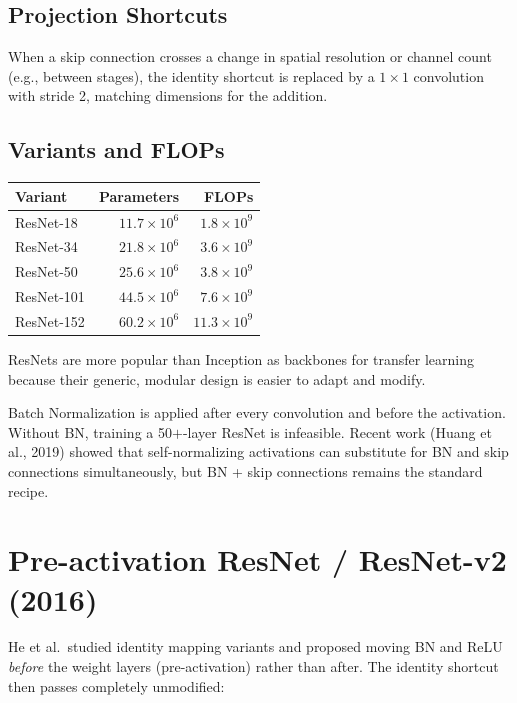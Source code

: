 \documentclass[11pt, oneside]{book}
\begin{document}
\subsection{Projection Shortcuts}

When a skip connection crosses a change in spatial resolution or channel count
(e.g., between stages), the identity shortcut is replaced by a $1\times1$
convolution with stride 2, matching dimensions for the addition.

\subsection{Variants and FLOPs}

\begin{center}
\small
\begin{tabular}{lrr}
\toprule
\textbf{Variant} & \textbf{Parameters} & \textbf{FLOPs} \\
\midrule
ResNet-18  & $11.7 \times 10^6$ & $1.8 \times 10^9$ \\
ResNet-34  & $21.8 \times 10^6$ & $3.6 \times 10^9$ \\
ResNet-50  & $25.6 \times 10^6$ & $3.8 \times 10^9$ \\
ResNet-101 & $44.5 \times 10^6$ & $7.6 \times 10^9$ \\
ResNet-152 & $60.2 \times 10^6$ & $11.3 \times 10^9$ \\
\bottomrule
\end{tabular}
\end{center}

ResNets are more popular than Inception as backbones for transfer learning
because their generic, modular design is easier to adapt and modify.

\begin{notebox}[title={Batch Normalization is Critical}]
Batch Normalization is applied after every convolution and before the activation.
Without BN, training a 50$+$-layer ResNet is infeasible.
Recent work (Huang et al., 2019) showed that self-normalizing activations can
substitute for BN and skip connections simultaneously, but BN + skip connections
remains the standard recipe.
\end{notebox}

\section{Pre-activation ResNet / ResNet-v2 (2016)}

He et al.\ studied identity mapping variants and proposed moving BN and ReLU
\emph{before} the weight layers (pre-activation) rather than after.
The identity shortcut then passes completely unmodified:
\end{document}
